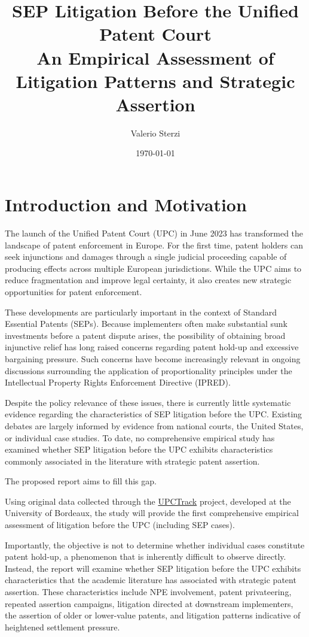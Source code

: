 \documentclass[12pt]{article}
\title{SEP Litigation Before the Unified Patent Court\\
\large An Empirical Assessment of Litigation Patterns and Strategic Assertion}
\author{Valerio Sterzi}
\affil{\small Bordeaux School of Economics, University of Bordeaux}
\date{\today}
\begin{document}
\maketitle



\section*{Introduction and Motivation}

The launch of the Unified Patent Court (UPC) in June 2023 has transformed the landscape of patent enforcement in Europe. For the first time, patent holders can seek injunctions and damages through a single judicial proceeding capable of producing effects across multiple European jurisdictions. While the UPC aims to reduce fragmentation and improve legal certainty, it also creates new strategic opportunities for patent enforcement.

These developments are particularly important in the context of Standard Essential Patents (SEPs). Because implementers often make substantial sunk investments before a patent dispute arises, the possibility of obtaining broad injunctive relief has long raised concerns regarding patent hold-up and excessive bargaining pressure. Such concerns have become increasingly relevant in ongoing discussions surrounding the application of proportionality principles under the Intellectual Property Rights Enforcement Directive (IPRED).

Despite the policy relevance of these issues, there is currently little systematic evidence regarding the characteristics of SEP litigation before the UPC. Existing debates are largely informed by evidence from national courts, the United States, or individual case studies. To date, no comprehensive empirical study has examined whether SEP litigation before the UPC exhibits characteristics commonly associated in the literature with strategic patent assertion.

The proposed report aims to fill this gap.

Using original data collected through the \href{https://upcdashboard.wordpress.com/}{UPCTrack} project, developed at the University of Bordeaux, the study will provide the first comprehensive empirical assessment of litigation before the UPC (including SEP cases).

Importantly, the objective is not to determine whether individual cases constitute patent hold-up, a phenomenon that is inherently difficult to observe directly. Instead, the report will examine whether SEP litigation before the UPC exhibits characteristics that the academic literature has associated with strategic patent assertion. These characteristics include NPE involvement, patent privateering, repeated assertion campaigns, litigation directed at downstream implementers, the assertion of older or lower-value patents, and litigation patterns indicative of heightened settlement pressure.
\end{document}
